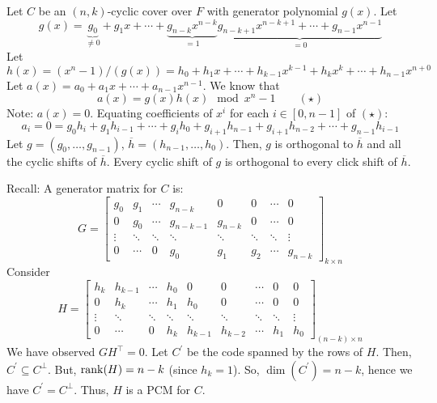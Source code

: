 Let $ C $ be an $ (n,k) $-cyclic cover over $ F $ with generator
polynomial $ g(x) $. Let
\[ g(x)=\underbrace{g_0}_{\neq 0}+g_1x+\cdots+\underbrace{g_{n-k}x^{n-k}}_{=1}
    \underbrace{g_{n-k+1}x^{n-k+1}+\cdots+g_{n-1}x^{n-1}}_{=0} \]
Let
\[ h(x)=(x^n-1)/(g(x))=h_0+h_1x+\cdots+h_{k-1}x^{k-1}+h_kx^k+\cdots+h_{n-1}x^{n+0} \]
Let $ a(x)=a_0+a_1x+\cdots+a_{n-1}x^{n-1} $. We know that
\[ a(x)=g(x)h(x)\mod x^n-1 \qquad (\star) \]
Note: $ a(x)=0 $. Equating coefficients of $ x^i $ for each $ i\in [0,n-1] $
of $ (\star) $:
\[ a_i=0=g_0h_i+g_1h_{i-1}+\cdots+g_ih_0+g_{i+1}h_{n-1}
    +g_{i+1}h_{n-2}+\cdots+g_{n-1}h_{i-1} \]
Let $ g=(g_0,\ldots ,g_{n-1}) $, $ \overline{h}=(h_{n-1},\ldots ,h_0) $.
Then, $ g $ is orthogonal to $ \overline{h} $ and all the cyclic shifts
of $ \overline{h} $. Every cyclic shift of $ g $ is orthogonal to
every click shift of $ \overline{h} $.

Recall: A generator matrix for $ C $ is:
\[ G=
    \left[
        \begin{array}{cccccccc}
            g_{0}  & g_{1}  & \cdots & g_{n-k}   & 0       & 0      & \cdots & 0       \\
            0      & g_{0}  & \cdots & g_{n-k-1} & g_{n-k} & 0      & \cdots & 0       \\
            \vdots & \ddots & \ddots & \ddots    & \ddots  & \ddots & \ddots & \vdots  \\
            0      & \cdots & 0      & g_{0}     & g_{1}   & g_{2}  & \cdots & g_{n-k}
        \end{array}
        \right]_{k \times n} \]
Consider
\[ H=
    \left[
        \begin{array}{ccccccccc}
            h_{k}  & h_{k-1} & \cdots & h_{0}  & 0       & 0       & \cdots & 0      & 0      \\
            0      & h_{k}   & \cdots & h_{1}  & h_{0}   & 0       & \cdots & 0      & 0      \\
            \vdots & \ddots  & \ddots & \ddots & \ddots  & \ddots  & \ddots & \ddots & \vdots \\
            0      & \cdots  & 0      & h_{k}  & h_{k-1} & h_{k-2} & \cdots & h_{1}  & h_{0}
        \end{array}
        \right]_{(n-k) \times n} \]
We have observed $ GH^{\top}=0 $. Let $ C^{\prime} $ be the code
spanned by the rows of $ H $. Then, $ C^{\prime}\subseteq C^{\perp} $.
But, $ \operatorname{rank}(H)=n-k $ (since $ h_k=1 $). So, $ \dim(C^\prime)=n-k $,
hence we have $ C^\prime=C^{\perp} $. Thus, $ H $ is a PCM for $ C $.

